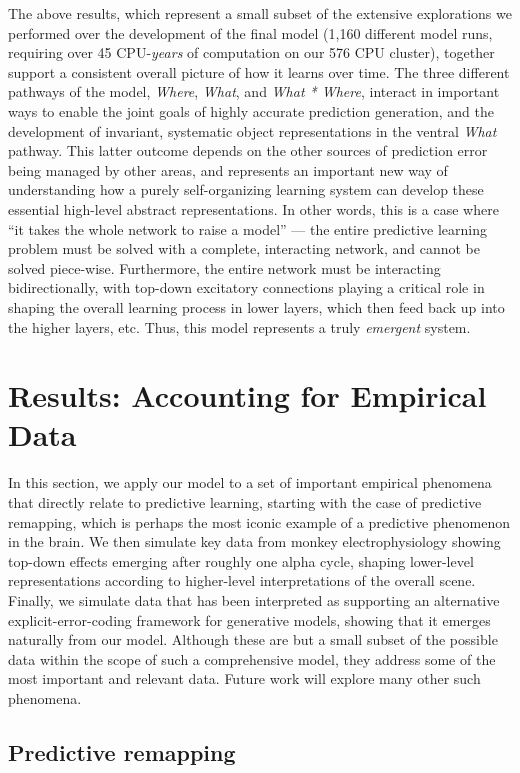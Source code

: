 \documentclass[11pt,twoside]{article}
\newif\myifpdf
\begin{document}
The above results, which represent a small subset of the extensive explorations we performed over the development of the final model (1,160 different model runs, requiring over 45 CPU-{\em years} of computation on our 576 CPU cluster), together support a consistent overall picture of how it learns over time.  The three different pathways of the model, {\em Where}, {\em What}, and {\em What * Where}, interact in important ways to enable the joint goals of highly accurate prediction generation, and the development of invariant, systematic object representations in the ventral {\em What} pathway.  This latter outcome depends on the other sources of prediction error being managed by other areas, and represents an important new way of understanding how a purely self-organizing learning system can develop these essential high-level abstract representations.  In other words, this is a case where ``it takes the whole network to raise a model'' --- the entire predictive learning problem must be solved with a complete, interacting network, and cannot be solved piece-wise.  Furthermore, the entire network must be interacting bidirectionally, with top-down excitatory connections playing a critical role in shaping the overall learning process in lower layers, which then feed back up into the higher layers, etc.  Thus, this model represents a truly {\em emergent} system.

\section{Results: Accounting for Empirical Data}

In this section, we apply our model to a set of important empirical phenomena that directly relate to predictive learning, starting with the case of predictive remapping, which is perhaps the most iconic example of a predictive phenomenon in the brain.  We then simulate key data from monkey electrophysiology showing top-down effects emerging after roughly one alpha cycle, shaping lower-level representations according to higher-level interpretations of the overall scene.  Finally, we simulate data that has been interpreted as supporting an alternative explicit-error-coding framework for generative models, showing that it emerges naturally from our model.  Although these are but a small subset of the possible data within the scope of such a comprehensive model, they address some of the most important and relevant data.  Future work will explore many other such phenomena.

\subsection{Predictive remapping}
\end{document}
